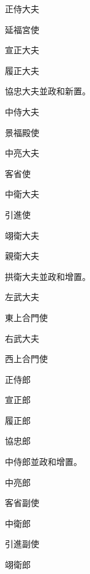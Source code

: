 \begin{pinyinscope}
 正侍大夫



 延福宮使



 宣正大夫



 履正大夫



 協忠大夫並政和新置。



 中侍大夫



 景福殿使



 中亮大夫



 客省使



 中衛大夫



 引進使



 翊衛大夫



 親衛大夫



 拱衛大夫並政和增置。



 左武大夫



 東上合門使



 右武大夫



 西上合門使



 正侍郎



 宣正郎



 履正郎



 協忠郎



 中侍郎並政和增置。



 中亮郎



 客省副使



 中衛郎



 引進副使



 翊衛郎




\end{pinyinscope}
